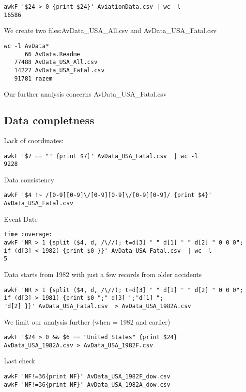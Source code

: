 \documentclass{article}
\begin{document}
\begin{verbatim}
awkF '$24 > 0 {print $24}' AviationData.csv | wc -l
16586
\end{verbatim}

We create two files:AvData\_USA\_All.csv and AvData\_USA\_Fatal.csv

\begin{verbatim}
wc -l AvData*
      66 AvData.Readme
   77488 AvData_USA_All.csv
   14227 AvData_USA_Fatal.csv
   91781 razem
\end{verbatim}

Our further analysis concerns AvData\_USA\_Fatal.csv

\subsection{Data completness}\label{data-completness}

Lack of coordinates:

\begin{verbatim}
awkF '$7 == "" {print $7}' AvData_USA_Fatal.csv  | wc -l
9228
\end{verbatim}

Data consistency

\begin{verbatim}
awkF '$4 !~ /[0-9][0-9]\/[0-9][0-9]\/[0-9][0-9]/ {print $4}' AvData_USA_Fatal.csv
\end{verbatim}

Event Date

\begin{verbatim}
time coverage:
awkF 'NR > 1 {split ($4, d, /\//); t=d[3] " " d[1] " " d[2] " 0 0 0"; if (d[3] < 1982) {print $0 }}' AvData_USA_Fatal.csv  | wc -l
5
\end{verbatim}

Data starts from 1982 with just a few records from older accidents

\begin{verbatim}
awkF 'NR > 1 {split ($4, d, /\//); t=d[3] " " d[1] " " d[2] " 0 0 0"; if (d[3] > 1981) {print $0 ";" d[3] ";"d[1] ";
"d[2] }}' AvData_USA_Fatal.csv  > AvData_USA_1982A.csv
\end{verbatim}

We limit our analysis further (when = 1982 and earlier)

\begin{verbatim}
awkF '$24 > 0 && $6 == "United States" {print $24}' AvData_USA_1982A.csv > AvData_USA_1982F.csv
\end{verbatim}

Last check

\begin{verbatim}
awkF 'NF!=36{print NF}' AvData_USA_1982F_dow.csv  
awkF 'NF!=36{print NF}' AvData_USA_1982A_dow.csv
\end{verbatim}
\end{document}
